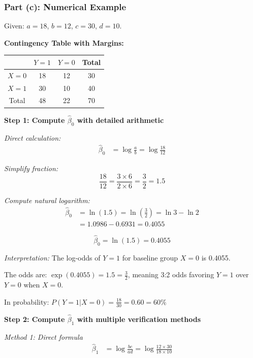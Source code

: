\documentclass[12pt]{article}
\begin{document}
\subsubsection{Part (c): Numerical Example}

\begin{solution}
Given: $a = 18$, $b = 12$, $c = 30$, $d = 10$.

\textbf{Contingency Table with Margins:}

\begin{center}
\begin{tabular}{c|cc|c}
& $Y=1$ & $Y=0$ & Total \\
\hline
$X=0$ & 18 & 12 & 30 \\
$X=1$ & 30 & 10 & 40 \\
\hline
Total & 48 & 22 & 70
\end{tabular}
\end{center}

\textbf{Step 1: Compute $\hat{\beta}_0$ with detailed arithmetic}

\textit{Direct calculation:}
\begin{align*}
\hat{\beta}_0 &= \log\frac{a}{b} = \log\frac{18}{12}
\end{align*}

\textit{Simplify fraction:}
\[
\frac{18}{12} = \frac{3 \times 6}{2 \times 6} = \frac{3}{2} = 1.5
\]

\textit{Compute natural logarithm:}
\begin{align*}
\hat{\beta}_0 &= \ln(1.5) = \ln\left(\frac{3}{2}\right) = \ln 3 - \ln 2 \\
&= 1.0986 - 0.6931 = 0.4055
\end{align*}

\[
\boxed{\hat{\beta}_0 = \ln(1.5) = 0.4055}
\]

\textit{Interpretation:}
The log-odds of $Y=1$ for baseline group $X=0$ is 0.4055.

The odds are: $\exp(0.4055) = 1.5 = \frac{3}{2}$, meaning 3:2 odds favoring $Y=1$ over $Y=0$ when $X=0$.

In probability: $P(Y=1|X=0) = \frac{18}{30} = 0.60 = 60\%$

\textbf{Step 2: Compute $\hat{\beta}_1$ with multiple verification methods}

\textit{Method 1: Direct formula}
\begin{align*}
\hat{\beta}_1 &= \log\frac{bc}{ad} = \log\frac{12 \times 30}{18 \times 10}
\end{align*}


\end{solution}
\end{document}
